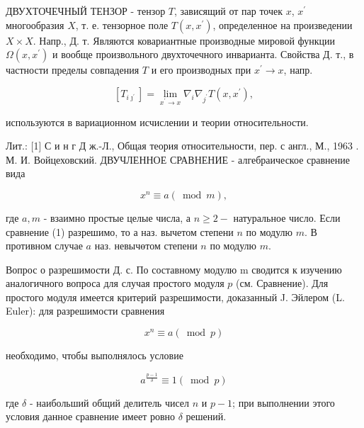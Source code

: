 \documentclass[10pt]{article}
\begin{document}
ДВУХТОЧЕЧНЫЙ ТЕНЗОР - тензор $T$, зависящий от пар точек $x$, $x^{\prime}$ многообразия $X$, т. е. тензорное поле $T\left(x, x^{\prime}\right)$, определенное на произведении $X \times X$. Напр., Д. т. Являются ковариантные производные мировой функции $\Omega\left(x, x^{\prime}\right)$ и вообще произвольного двухточечного инварианта. Свойства Д. т., в частности пределы совпадения $T$ и его производных при $x^{\prime} \rightarrow x$, напр.



\[

\left[T_{i \jmath^{\prime}}\right]=\lim _{x^{\prime} \rightarrow x} \nabla_{i} \nabla_{j^{\prime}} T\left(x, x^{\prime}\right),

\]



используются в вариационном исчислении и теории относительности.



Лит.: [1] С и н г Д ж.-Л., Общая теория относительности, пер. с англ., М., 1963 . М. И. Войцеховский. ДВУЧЛЕННОЕ СРАВНЕНИЕ - алгебраическое сравнение вида



\[

x^{n} \equiv a(\bmod m),

\]



где $a, m$ - взаимно простые целые числа, а $n \geqslant 2-$ натуральное число. Если сравнение (1) разрешимо, то а наз. вычетом степени $n$ по модулю $m$. В противном случае $a$ наз. невычөтом степени $n$ по модулю $m$.



Вопрос о разрешимости Д. с. По составному модулю $\mathrm{m}$ сводится к изучению аналогичного вопроса для случая простого модуля $p$ (см. Сравнение). Для простого модуля имеется критерий разрешимости, доказанный J. Эйлером (L. Euler): для разрешимости сравнения



\[

x^{n} \equiv a(\bmod p)

\]



необходимо, чтобы выполнялось условие



\[

a^{\frac{p-1}{\delta}} \equiv 1(\bmod p)

\]



где $\delta$ - наибольший общий делитель чисел $n$ и $p-1$; при выполнении этого условия данное сравнение имеет ровно $\delta$ решений.
\end{document}
